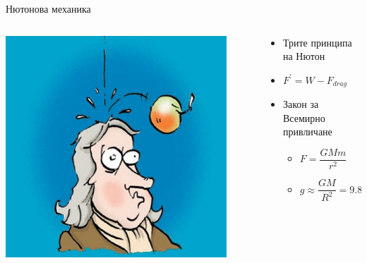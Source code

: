 \documentclass[10pt,a4paper]{beamer}
\begin{document}
        \begin{frame}{ Нютонова механика }
            \begin{columns}
                \begin{column}{0.5\textwidth}
                    \includegraphics[width=0.9\textwidth]{images/newton_apple.jpg}
                \end{column}
                \begin{column}{0.5\textwidth}
                    \begin{itemize}
                        \item Трите принципа на Нютон
                        \item $ F^{\prime} = W - F_{drag} $
                        \item Закон за Всемирно привличане \begin{itemize}
                            \item $ F = \dfrac{GMm}{r^2} $
                            \item $ g \approx \dfrac{GM}{R^2} = 9.81 \mbox{m/s}^2 $
                        \end{itemize}
                    \end{itemize}
                \end{column}
            \end{columns}
        \end{frame}
        
\end{document}

